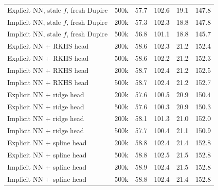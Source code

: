 \begin{tabular}{l l rrrr}
Explicit NN, stale $f$, fresh Dupire & 500k & 57.7 & 102.6 & 19.1 & 147.8\\
Implicit NN, stale $f$, fresh Dupire & 200k & 57.3 & 102.3 & 18.8 & 147.8\\
Implicit NN, stale $f$, fresh Dupire & 500k & 56.8 & 101.1 & 18.8 & 145.7\\
Explicit NN + RKHS head & 200k & 58.6 & 102.3 & 21.2 & 152.4\\
Explicit NN + RKHS head & 500k & 58.6 & 102.2 & 21.2 & 152.3\\
Implicit NN + RKHS head & 200k & 58.7 & 102.4 & 21.2 & 152.5\\
Implicit NN + RKHS head & 500k & 58.7 & 102.4 & 21.2 & 152.7\\
Explicit NN + ridge head & 200k & 57.6 & 100.5 & 20.9 & 150.4\\
Explicit NN + ridge head & 500k & 57.6 & 100.3 & 20.9 & 150.3\\
Implicit NN + ridge head & 200k & 58.1 & 101.3 & 21.0 & 152.0\\
Implicit NN + ridge head & 500k & 57.7 & 100.4 & 21.1 & 150.9\\
Explicit NN + spline head & 200k & 58.8 & 102.4 & 21.4 & 152.8\\
Explicit NN + spline head & 500k & 58.8 & 102.5 & 21.5 & 152.8\\
Implicit NN + spline head & 200k & 58.9 & 102.4 & 21.5 & 152.8\\
Implicit NN + spline head & 500k & 58.8 & 102.4 & 21.4 & 152.8\\
\bottomrule
\end{tabular}
